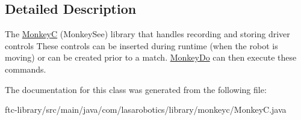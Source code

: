 \subsection{Detailed Description}
The \hyperlink{classcom_1_1lasarobotics_1_1library_1_1monkeyc_1_1_monkey_c}{Monkey\+C} (Monkey\+See) library that handles recording and storing driver controls These controls can be inserted during runtime (when the robot is moving) or can be created prior to a match. \hyperlink{classcom_1_1lasarobotics_1_1library_1_1monkeyc_1_1_monkey_do}{Monkey\+Do} can then execute these commands. 

The documentation for this class was generated from the following file\+:\begin{DoxyCompactItemize}
\item 
ftc-\/library/src/main/java/com/lasarobotics/library/monkeyc/Monkey\+C.\+java\end{DoxyCompactItemize}
